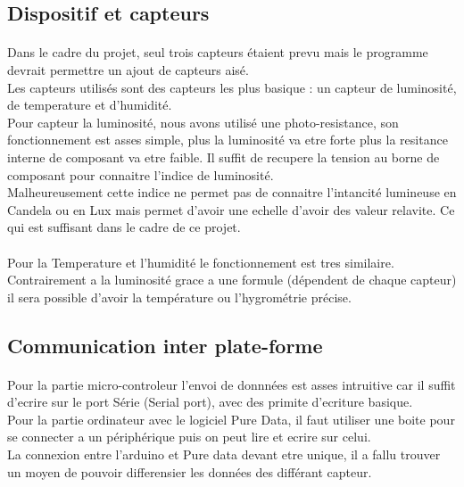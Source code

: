 \documentclass[a4paper, titlepage, oneside, 12pt]{article}%
\begin{document}
\subsection{Dispositif et capteurs}
\paragraph{}
Dans le cadre du projet, seul trois capteurs étaient prevu mais le programme devrait permettre un ajout de capteurs  aisé.\\
Les capteurs utilisés sont des capteurs les plus basique : un capteur de luminosité, de temperature et d'humidité.\\
Pour capteur la luminosité, nous avons utilisé une photo-resistance, son fonctionnement est asses simple, plus la luminosité va etre forte plus la resitance interne de composant va etre faible. Il suffit de recupere la tension au borne de composant pour connaitre l'indice de luminosité.\\ 
Malheureusement cette indice ne permet pas de connaitre l'intancité lumineuse en Candela ou en Lux mais permet d'avoir une echelle d'avoir des valeur relavite. Ce qui est suffisant dans le cadre de ce projet.
\paragraph{}
Pour la Temperature et l'humidité le fonctionnement est tres similaire. Contrairement a la luminosité grace a une formule (dépendent de chaque capteur) il sera possible d'avoir la température ou l'hygrométrie précise. 

\subsection{Communication inter plate-forme}
\paragraph{}
Pour la partie micro-controleur l'envoi de donnnées est asses intruitive car il suffit d'ecrire sur le port Série (Serial port), avec des primite d'ecriture basique.\\
Pour la partie ordinateur avec le logiciel Pure Data, il faut utiliser une boite pour se connecter a un périphérique puis on peut lire et ecrire sur celui.\\
La connexion entre l'arduino et Pure data devant etre unique, il a fallu trouver un moyen de pouvoir differensier les données des différant capteur. 
\end{document}
